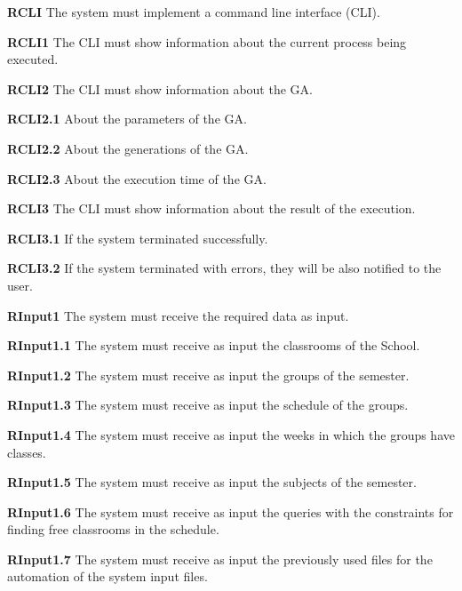 \begin{description}

    \item \textbf{RCLI} The system must implement a command line interface (CLI).
        \begin{description}
            \item \textbf{RCLI1} The CLI must show information about the current process being executed.
            \item \textbf{RCLI2} The CLI must show information about the GA.
                \begin{description}
                    \item \textbf{RCLI2.1} About the parameters of the GA.
                    \item \textbf{RCLI2.2} About the generations of the GA.
                    \item \textbf{RCLI2.3} About the execution time of the GA.
                \end{description}
            \item \textbf{RCLI3} The CLI must show information about the result of the execution.
                \begin{description}
                    \item \textbf{RCLI3.1} If the system terminated successfully.
                    \item \textbf{RCLI3.2} If the system terminated with errors, they will be also notified to the user.
                \end{description}
        \end{description}

    \item \textbf{RInput1} The system must receive the required data as input.
        \begin{description}
            \item \textbf{RInput1.1} The system must receive as input the classrooms of the School.
            \item \textbf{RInput1.2} The system must receive as input the groups of the semester.
            \item \textbf{RInput1.3} The system must receive as input the schedule of the groups.
            \item \textbf{RInput1.4} The system must receive as input the weeks in which the groups have classes.
            \item \textbf{RInput1.5} The system must receive as input the subjects of the semester.
            \item \textbf{RInput1.6} The system must receive as input the queries with the constraints for finding free classrooms in the schedule.
            \item \textbf{RInput1.7} The system must receive as input the previously used files for the automation of the system input files.
        \end{description}


\end{description}
